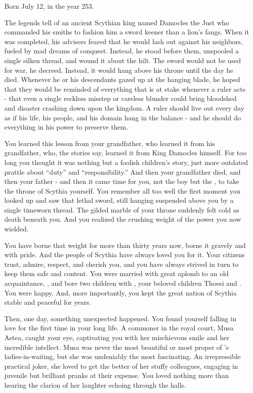\documentclass[char]{Kos}
\begin{document}
\name{\cScythiaKing{}}

Born July 12, in the year 253.

The legends tell of an ancient Scythian king named Damocles the Just who commanded his smiths to fashion him a sword keener than a lion's fangs. When it was completed, his advisers feared that he would lash out against his neighbors, fueled by mad dreams of conquest. Instead, he stood before them, unspooled a single silken thread, and wound it about the hilt. The sword would not be used for war, he decreed. Instead, it would hang above his throne until the day he died. Whenever he or his descendants gazed up at the hanging blade, he hoped that they would be reminded of everything that is at stake whenever a ruler acts - that even a single reckless misstep or careless blunder could bring bloodshed and disaster crashing down upon the kingdom. A ruler should live out every day as if his life, his people, and his domain hang in the balance - and he should do everything in his power to preserve them.

    You learned this lesson from your grandfather, who learned it from his grandfather, who, the stories say, learned it from King Damocles himself. For too long you thought it was nothing but a foolish children's story, just more outdated prattle about ``duty'' and ``responsibility.'' And then your grandfather died, and then your father - and then it came time for you, not \cScythiaKing{} the boy but \cScythiaKing{} the \cScythiaKing{\Monarch}, to take the throne of Scythia yourself. You remember all too well the first moment you looked up and saw that lethal sword, still hanging suspended above you by a single timeworn thread. The gilded marble of your throne suddenly felt cold as death beneath you. And you realized the crushing weight of the power you now wielded.

    You have borne that weight for more than thirty years now, borne it gravely and with pride. And the people of Scythia have always loved you for it. Your citizens trust, admire, respect, and cherish you, and you have always strived in turn to keep them safe and content. You were married with great aplomb to an old acquaintance, \cScythiaQueen{}, and bore two children with \cScythiaQueen{\them}, your beloved children Thoesi and \cBride{}. You were happy. And, more importantly, you kept the great nation of Scythia stable and peaceful for years.

    Then, one day, something unexpected happened. You found yourself falling in love for the first time in your long life. A commoner in the royal court, Musa Astea, caught your eye, captivating you with her mischievous smile and her incredible intellect. Musa was never the most beautiful or most proper of \cScythiaQueen{}'s ladies-in-waiting, but she was undeniably the most fascinating. An irrepressible practical joker, she loved to get the better of her stuffy colleagues, engaging in juvenile but brilliant pranks at their expense. You loved nothing more than hearing the clarion of her laughter echoing through the halls.
\end{document}
